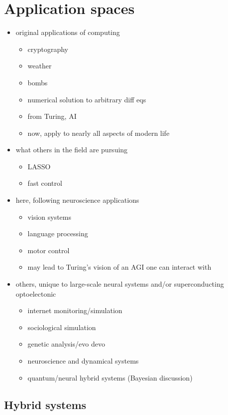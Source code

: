 \documentclass[twocolumn]{article}
\begin{document}
\section{\label{sec:applications}Application spaces}

\begin{itemize}
\item original applications of computing
\begin{itemize}
\item cryptography
\item weather
\item bombs
\item numerical solution to arbitrary diff eqs
\item from Turing, AI
\item now, apply to nearly all aspects of modern life
\end{itemize}
\item what others in the field are pursuing
\begin{itemize}
\item LASSO \cite{dasr2018}
\item fast control \cite{prsh2017}
\end{itemize}
\item here, following neuroscience applications 
\begin{itemize}
\item vision systems
\item language processing
\item motor control
\item may lead to Turing's vision of an AGI one can interact with
\end{itemize}
\item others, unique to large-scale neural systems and/or superconducting optoelectonic
\begin{itemize}
\item internet monitoring/simulation
\item sociological simulation
\item genetic analysis/evo devo
\item neuroscience and dynamical systems
\item quantum/neural hybrid systems (Bayesian discussion)
\end{itemize}
\end{itemize}

\subsection{Hybrid systems}
\end{document}
